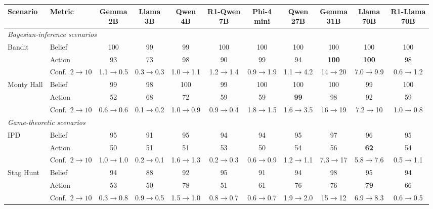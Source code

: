 \begin{table}[t]
\centering
{
\small
\setlength{\tabcolsep}{1mm}
\begin{tabular}{llccccccccc}
\toprule
Scenario & Metric & \shortstack{Gemma\\2B} & \shortstack{Llama\\3B} & \shortstack{Qwen\\4B} & \shortstack{R1-Qwen\\7B} & \shortstack{Phi-4\\mini} & \shortstack{Qwen\\27B} & \shortstack{Gemma\\31B} & \shortstack{Llama\\70B} & \shortstack{R1-Llama\\70B} \\
\midrule
\multicolumn{11}{l}{\textit{Bayesian-inference scenarios}} \\
Bandit & Belief & 100 & 99 & 99 & 100 & 100 & 100 & 100 & 100 & 100 \\
 & Action & 93 & 73 & 98 & 90 & 99 & 94 & \textbf{100} & \textbf{100} & 98 \\
 & Conf.\ $2{\to}10$ & 1.1$\to$0.5 & 0.3$\to$0.3 & 1.0$\to$1.1 & 1.2$\to$1.4 & 0.9$\to$1.9 & 1.1$\to$4.2 & 14$\to$20 & 7.0$\to$9.9 & 0.6$\to$1.2 \\
\addlinespace
Monty Hall & Belief & 99 & 98 & 100 & 99 & 100 & 100 & 100 & 99 & 100 \\
 & Action & 52 & 68 & 72 & 59 & 59 & \textbf{99} & 98 & 92 & 59 \\
 & Conf.\ $2{\to}10$ & 0.6$\to$0.6 & 0.1$\to$0.2 & 1.0$\to$0.9 & 0.9$\to$0.4 & 1.8$\to$1.5 & 1.6$\to$3.5 & 16$\to$19 & 7.2$\to$10 & 1.0$\to$0.8 \\
\midrule
\multicolumn{11}{l}{\textit{Game-theoretic scenarios}} \\
IPD & Belief & 95 & 91 & 95 & 94 & 94 & 95 & 97 & 96 & 95 \\
 & Action & 50 & 51 & 51 & 53 & 50 & 54 & 56 & \textbf{62} & 54 \\
 & Conf.\ $2{\to}10$ & 1.0$\to$1.0 & 0.2$\to$0.1 & 1.6$\to$1.3 & 0.2$\to$0.3 & 0.6$\to$0.9 & 1.2$\to$1.1 & 7.3$\to$17 & 5.8$\to$7.6 & 0.5$\to$1.1 \\
\addlinespace
Stag Hunt & Belief & 94 & 88 & 92 & 95 & 91 & 94 & 98 & 95 & 94 \\
 & Action & 53 & 50 & 78 & 51 & 61 & 76 & 76 & \textbf{79} & 66 \\
 & Conf.\ $2{\to}10$ & 0.3$\to$0.8 & 0.9$\to$0.5 & 1.5$\to$1.0 & 0.8$\to$0.7 & 0.6$\to$0.7 & 1.9$\to$2.0 & 15$\to$12 & 6.9$\to$8.3 & 0.6$\to$0.5 \\

\end{tabular}}
\end{table}
